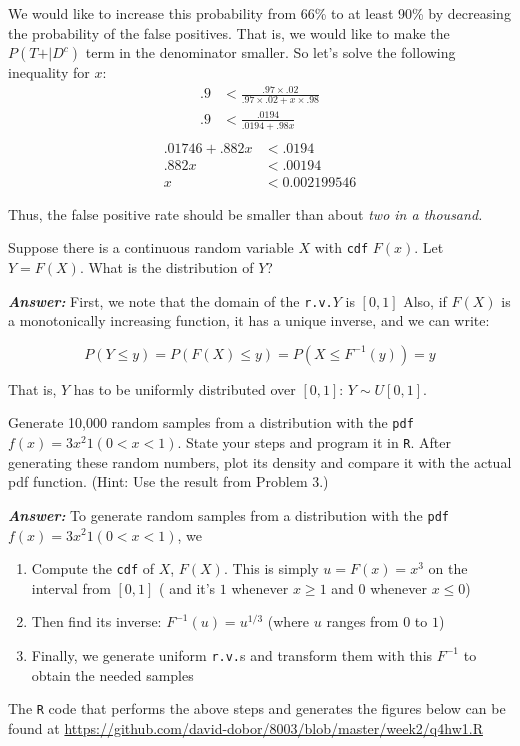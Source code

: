 \documentclass[12pt]{article}
\newenvironment{question}[2][Question]{\begin{trivlist}
\item[\hskip \labelsep {\bfseries #1}\hskip \labelsep {\bfseries #2.}]}{\end{trivlist}}
\begin{document}
 We would like to increase this probability from 66\% to at least 90\% by decreasing the probability of the false positives. That is, we would like to make the $P(T\text{+} | D^c)$ term in the denominator smaller. So let's solve the following inequality for $x$:
 \begin{align*}
 .9 &< \frac{.97 \times .02}{.97 \times .02 + x\times .98}\\
 .9 &< \frac{.0194} { .0194 +  .98x}\\
\end{align*}
 \begin{align*} 
.01746 + .882 x &<  .0194 \\
.882 x &< .00194 \\
x &< 0.002199546
\end{align*}

Thus, the false positive rate should be smaller than about \emph{two in a thousand.}


\bigskip
\bigskip
\begin{question}{2.3} Suppose there is a continuous random variable $X$ with \texttt{cdf} $F(x) $. Let $ Y = F(X) $. What is the distribution of $Y$? 
\end{question}

\textbf{\color{TealBlue}\emph{Answer:} } 
First, we note that the domain of the \texttt{r.v.}$Y$ is $[0, 1]$ Also, if $F(X)$ is a monotonically increasing function, it has a unique inverse, and we can write: 


$$
P ( Y \leq y ) = P( F(X) \leq y) = P( X \leq F^{-1}(y) ) = y
$$

That is, $Y$ has to be uniformly distributed over $[0, 1]$: $Y \sim U[0, 1]$.


\bigskip
\bigskip
\begin{question}{2.4} 
Generate 10,000 random samples from a distribution with the \texttt{pdf} $f(x) = 3 x^2 1(0 < x < 1) $. State your steps and program it in \texttt{R}. After generating these random numbers, plot its density and compare it with the actual pdf function. (Hint: Use the result from Problem 3.)

\end{question}


\textbf{\color{TealBlue}\emph{Answer:} } To generate random samples from a distribution with the \texttt{pdf} $f(x) = 3 x^2 1(0 < x < 1) $, we 

\begin{enumerate}
\item Compute the \texttt{cdf} of $X$, $F(X)$. This is simply $u = F(x) = x^3$ on the interval from $[0,1]$ ( and it's $1$ whenever $x \geq 1$ and $0$ whenever $x \leq 0$)
\item Then find its inverse: $F^{-1}(u) = u^{1/3}$ (where $u$ ranges from $0$ to $1$)
\item Finally, we generate uniform \texttt{r.v.}s and transform them with this $F^{-1}$ to obtain the needed samples
\end{enumerate} 
 The \texttt{R} code that performs the above steps and generates the figures below can be found at \url{https://github.com/david-dobor/8003/blob/master/week2/q4hw1.R} 
 
\end{document}
